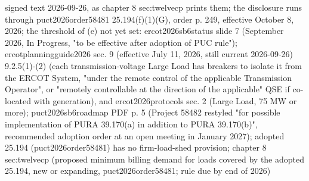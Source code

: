 signed text 2026-09-26, as chapter 8 sec:twelvecp prints them; the disclosure runs through puct2026order58481 25.194(f)(1)(G), order p. 249, effective October 8, 2026; the threshold of (e) not yet set: ercot2026sb6status slide 7 (September 2026, In Progress, "to be effective after adoption of PUC rule"); ercotplanningguide2026 sec. 9 (effective July 11, 2026, still current 2026-09-26) 9.2.5(1)-(2) (each transmission-voltage Large Load has breakers to isolate it from the ERCOT System, "under the remote control of the applicable Transmission Operator", or "remotely controllable at the direction of the applicable" QSE if co-located with generation), and ercot2026protocols sec. 2 (Large Load, 75 MW or more); puct2026sb6roadmap PDF p. 5 (Project 58482 restyled "for possible implementation of PURA 39.170(a) in addition to PURA 39.170(b)", recommended adoption order at an open meeting in January 2027); adopted 25.194 (puct2026order58481) has no firm-load-shed provision; chapter 8 sec:twelvecp (proposed minimum billing demand for loads covered by the adopted 25.194, new or expanding, puct2026order58481; rule due by end of 2026)
